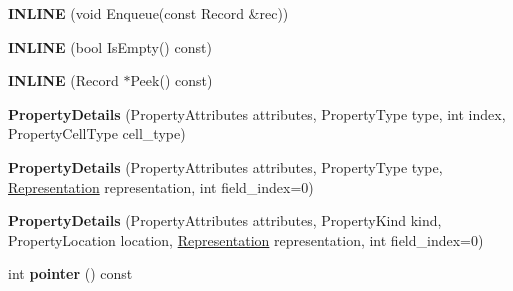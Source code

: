 \begin{DoxyCompactItemize}
\item 
{\bfseries I\+N\+L\+I\+NE} (void Enqueue(const Record \&rec))\hypertarget{classv8_1_1internal_1_1_b_a_s_e___e_m_b_e_d_d_e_d_ae39e155d4b067b68a3091d2a27ebfa4f}{}\label{classv8_1_1internal_1_1_b_a_s_e___e_m_b_e_d_d_e_d_ae39e155d4b067b68a3091d2a27ebfa4f}

\item 
{\bfseries I\+N\+L\+I\+NE} (bool Is\+Empty() const)\hypertarget{classv8_1_1internal_1_1_b_a_s_e___e_m_b_e_d_d_e_d_ae4367998e646da940fa7f07a22d84947}{}\label{classv8_1_1internal_1_1_b_a_s_e___e_m_b_e_d_d_e_d_ae4367998e646da940fa7f07a22d84947}

\item 
{\bfseries I\+N\+L\+I\+NE} (Record $\ast$Peek() const)\hypertarget{classv8_1_1internal_1_1_b_a_s_e___e_m_b_e_d_d_e_d_a8dc7db733d55b30b598a581a950f9a78}{}\label{classv8_1_1internal_1_1_b_a_s_e___e_m_b_e_d_d_e_d_a8dc7db733d55b30b598a581a950f9a78}

\item 
{\bfseries Property\+Details} (Property\+Attributes attributes, Property\+Type type, int index, Property\+Cell\+Type cell\+\_\+type)\hypertarget{classv8_1_1internal_1_1_b_a_s_e___e_m_b_e_d_d_e_d_aabd010f9d7aef74b01b526e9ae78c84c}{}\label{classv8_1_1internal_1_1_b_a_s_e___e_m_b_e_d_d_e_d_aabd010f9d7aef74b01b526e9ae78c84c}

\item 
{\bfseries Property\+Details} (Property\+Attributes attributes, Property\+Type type, \hyperlink{classv8_1_1internal_1_1_representation}{Representation} representation, int field\+\_\+index=0)\hypertarget{classv8_1_1internal_1_1_b_a_s_e___e_m_b_e_d_d_e_d_a1f5e37cfcb8260136e1c0b7b4077d752}{}\label{classv8_1_1internal_1_1_b_a_s_e___e_m_b_e_d_d_e_d_a1f5e37cfcb8260136e1c0b7b4077d752}

\item 
{\bfseries Property\+Details} (Property\+Attributes attributes, Property\+Kind kind, Property\+Location location, \hyperlink{classv8_1_1internal_1_1_representation}{Representation} representation, int field\+\_\+index=0)\hypertarget{classv8_1_1internal_1_1_b_a_s_e___e_m_b_e_d_d_e_d_a32975eb466512868038cd97b77889391}{}\label{classv8_1_1internal_1_1_b_a_s_e___e_m_b_e_d_d_e_d_a32975eb466512868038cd97b77889391}

\item 
int {\bfseries pointer} () const \hypertarget{classv8_1_1internal_1_1_b_a_s_e___e_m_b_e_d_d_e_d_a04ae025a2db2d495ceb213202de4d012}{}\label{classv8_1_1internal_1_1_b_a_s_e___e_m_b_e_d_d_e_d_a04ae025a2db2d495ceb213202de4d012}


\end{DoxyCompactItemize}

